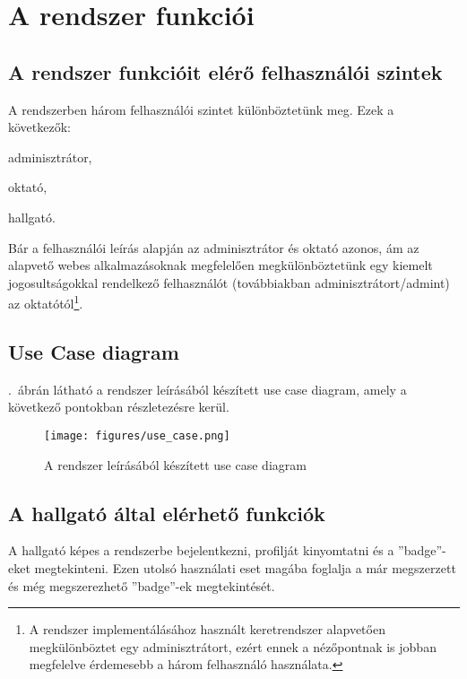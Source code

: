 \documentclass[a4paper,10pt,titlepage]{article}
\newenvironment{sajat_itemize}
{
	\begin{itemize}
	\setlength{\itemsep}{0pt}
}
{
	\end{itemize}
}
\begin{document}
\section{A rendszer funkciói}

\subsection{A rendszer funkcióit elérő felhasználói szintek}

A rendszerben három felhasználói szintet különböztetünk meg. Ezek a következők:

\begin{sajat_itemize}
\item adminisztrátor,
\item oktató,
\item hallgató.
\end{sajat_itemize}

Bár a felhasználói leírás alapján az adminisztrátor és oktató azonos, ám az alapvető webes alkalmazásoknak megfelelően megkülönböztetünk egy kiemelt jogosultságokkal rendelkező felhasználót (továbbiakban adminisztrátort/admint) az oktatótól\footnote{A rendszer implementálásához használt keretrendszer alapvetően megkülönböztet egy adminisztrátort, ezért ennek a nézőpontnak is jobban megfelelve érdemesebb a három felhasználó használata.}.

\subsection{Use Case diagram}

.~ábrán látható a rendszer leírásából készített use case diagram, amely a következő pontokban részletezésre kerül.

\begin{figure}[ht!]
\centering
\texttt{[image: figures/use\_case.png]}
\caption{A rendszer leírásából készített use case diagram \label{fig:use_case}}
\end{figure}

\subsection{A hallgató által elérhető funkciók}

A hallgató képes a rendszerbe bejelentkezni, profilját kinyomtatni és a ''badge''-eket megtekinteni. Ezen utolsó használati eset magába foglalja a már megszerzett és még megszerezhető ''badge''-ek megtekintését.
\end{document}
